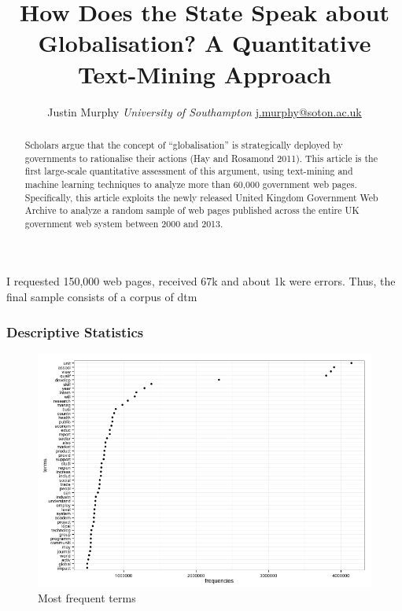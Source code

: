\documentclass[11pt,article,oneside]{memoir}
\title{\bigskip \bigskip How Does the State Speak about Globalisation? A Quantitative Text-Mining
Approach}
\author{\Large Justin Murphy\vspace{0.05in} \newline\normalsize\emph{University of Southampton} \newline\footnotesize \url{j.murphy@soton.ac.uk}\vspace*{0.2in}\newline }
\date{}
\makeatletter
\def\maxwidth{\ifdim\Gin@nat@width>\linewidth\linewidth
\else\Gin@nat@width\fi}
\let\Oldincludegraphics\includegraphics
\renewcommand{\includegraphics}[1]{\Oldincludegraphics[width=\maxwidth]{#1}}
\makeatother
\begin{document}
  
\setsansfont[Mapping=tex-text]{Gill Sans} 
\setmonofont[Mapping=tex-text,Scale=0.8]{Consolas}

\doublespacing


\maketitle



\begin{abstract}

\noindent Scholars argue that the concept of ``globalisation'' is strategically
deployed by governments to rationalise their actions (Hay and Rosamond
2011). This article is the first large-scale quantitative assessment of
this argument, using text-mining and machine learning techniques to
analyze more than 60,000 government web pages. Specifically, this
article exploits the newly released United Kingdom Government Web
Archive to analyze a random sample of web pages published across the
entire UK government web system between 2000 and 2013.

\end{abstract}


I requested 150,000 web pages, received 67k and about 1k were errors.
Thus, the final sample consists of a corpus of dtm

\pagebreak

\subsubsection{Descriptive Statistics}\label{descriptive-statistics}

\begin{figure}[htbp]
\centering
\includegraphics{figure/globalisation_frequency_plot.png}
\caption{Most frequent terms}
\end{figure}
\end{document}
